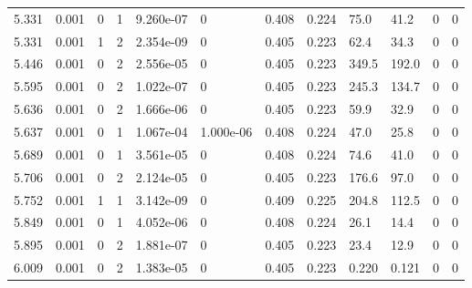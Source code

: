 \documentclass[preview]{standalone}
\begin{document}
{{{\begin{tabular}{L{1.2cm}C{1.2cm} C{0.3cm}C{0.5cm} C{1.4cm}C{1.4cm} C{1.4cm}C{1.4cm} C{1.6cm}C{1.6cm} C{1.6cm}C{1.6cm}}
  5.331  &  0.001  & 0     &  1 &  9.260e-07  & 0  &  0.408&   0.224& 75.0 & 41.2   &  0 & 0  \\ 
  5.331  &  0.001  & 1     &  2 &  2.354e-09  & 0  &  0.405&   0.223& 62.4 & 34.3   &  0 & 0  \\ 
  5.446  &  0.001  & 0     &  2 &  2.556e-05  & 0  &  0.405&   0.223& 349.5 & 192.0   &  0 & 0  \\ 
  5.595  &  0.001  & 0     &  2 &  1.022e-07  & 0  &  0.405&   0.223& 245.3 & 134.7   &  0 & 0  \\ 
  5.636  &  0.001  & 0     &  2 &  1.666e-06  & 0  &  0.405&   0.223& 59.9 & 32.9   &  0 & 0  \\ 
  5.637  &  0.001  & 0     &  1 &  1.067e-04  & 1.000e-06  &  0.408&   0.224& 47.0 & 25.8   &  0 & 0  \\ 
  5.689  &  0.001  & 0     &  1 &  3.561e-05  & 0  &  0.408&   0.224& 74.6 & 41.0   &  0 & 0  \\ 
  5.706  &  0.001  & 0     &  2 &  2.124e-05  & 0  &  0.405&   0.223& 176.6 & 97.0   &  0 & 0  \\ 
  5.752  &  0.001  & 1     &  1 &  3.142e-09  & 0  &  0.409&   0.225& 204.8 & 112.5   &  0 & 0  \\ 
  5.849  &  0.001  & 0     &  1 &  4.052e-06  & 0  &  0.408&   0.224& 26.1 & 14.4   &  0 & 0  \\ 
  5.895  &  0.001  & 0     &  2 &  1.881e-07  & 0  &  0.405&   0.223& 23.4 & 12.9   &  0 & 0  \\ 
  6.009  &  0.001  & 0     &  2 &  1.383e-05  & 0  &  0.405&   0.223& 0.220 & 0.121   &  0 & 0  \\ 
\hline 
\end{tabular} 

}}}
\end{document}
